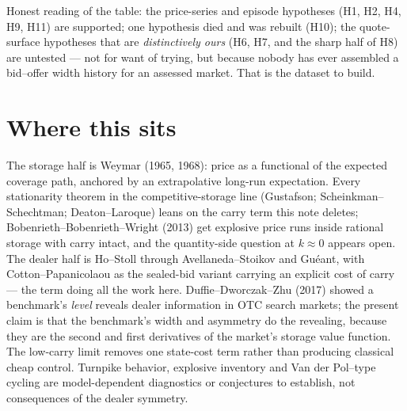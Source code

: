 \documentclass[11pt]{article}
\begin{document}
Honest reading of the table: the price-series and episode hypotheses (H1, H2, H4, H9, H11) are supported; one hypothesis died and was rebuilt (H10); the quote-surface hypotheses that are \emph{distinctively ours} (H6, H7, and the sharp half of H8) are untested --- not for want of trying, but because nobody has ever assembled a bid--offer width history for an assessed market. That is the dataset to build.

\section{Where this sits}

The storage half is Weymar (1965, 1968): price as a functional of the expected coverage path, anchored by an extrapolative long-run expectation. Every stationarity theorem in the competitive-storage line (Gustafson; Scheinkman--Schechtman; Deaton--Laroque) leans on the carry term this note deletes; Bobenrieth--Bobenrieth--Wright (2013) get explosive price runs inside rational storage with carry intact, and the quantity-side question at $k \approx 0$ appears open. The dealer half is Ho--Stoll through Avellaneda--Stoikov and Gu\'eant, with Cotton--Papanicolaou as the sealed-bid variant carrying an explicit cost of carry --- the term doing all the work here. Duffie--Dworczak--Zhu (2017) showed a benchmark's \emph{level} reveals dealer information in OTC search markets; the present claim is that the benchmark's width and asymmetry do the revealing, because they are the second and first derivatives of the market's storage value function. The low-carry limit removes one state-cost term rather than producing classical cheap control. Turnpike behavior, explosive inventory and Van der Pol--type cycling are model-dependent diagnostics or conjectures to establish, not consequences of the dealer symmetry.
\end{document}

